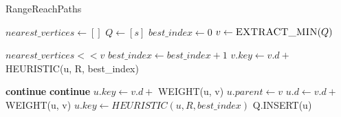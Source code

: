 {%




\begin{algorithm*}[t]
\caption{RangeReachPaths}
\label{alg3}
\begin{multicols}{2}
\begin{algorithmic}[1]
	\State $nearest\_vertices \gets []$
	\State $Q \gets [s]$
	\State $best\_index \gets 0$
		\State $v \gets \Call{EXTRACT\_MIN}{Q}$
		
			\State $nearest\_vertices << v$ 
			\State $best\_index \gets best\_index + 1$
				\State \Return {}
			\EndIf
			 
				\State $v.key \gets v.d +$ HEURISTIC(u, R, best\_index)
			\EndFor
		\EndIf
		
					\State \textbf{continue}
				\EndIf
							\State \textbf{continue}
						\Else
							\State $u.key \gets v.d +$ WEIGHT(u, v)
						\EndIf
					\Else
						\State $u.parent \gets v$
						\State $u.d \gets v.d +$ WEIGHT(u, v)
						\State $u.key \gets HEURISTIC(u, R, best\_index)$
						\State Q.INSERT(u)
					\EndIf
				\EndIf
			\EndFor
		\EndIf
	\EndWhile
\EndFunction


\end{algorithmic}
\end{multicols}
\end{algorithm*}}
